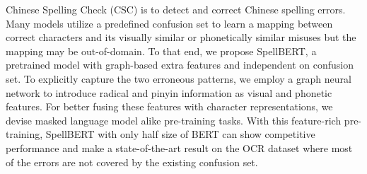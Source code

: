 Chinese Spelling Check (CSC) is to detect and correct Chinese spelling errors. Many models utilize a predefined confusion set to learn a mapping between correct characters and its visually similar or phonetically similar misuses but the mapping may be out-of-domain. To that end, we propose SpellBERT,  a pretrained model with graph-based extra features and independent on confusion set. To explicitly capture the two erroneous patterns, we employ a graph neural network to introduce radical and pinyin information as visual and phonetic features. For better fusing these features with character representations, we devise masked language model alike pre-training tasks. With this feature-rich pre-training, SpellBERT with only half size of BERT can show competitive performance and make a state-of-the-art result on the OCR dataset where most of the errors are not covered by the existing confusion set.
